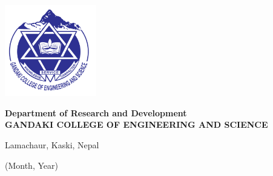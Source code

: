 \begin{titlepage}
\begin{center}
			\vskip1cm
			
			\includegraphics[width=4cm]{gces.png}
			
			\vskip1cm
			
			\textbf{Department of Research and Development \\ GANDAKI COLLEGE OF ENGINEERING AND SCIENCE}
			
			Lamachaur, Kaski, Nepal
			
			\vskip1cm
			 (Month, Year)

		\end{center}
	\end{titlepage}